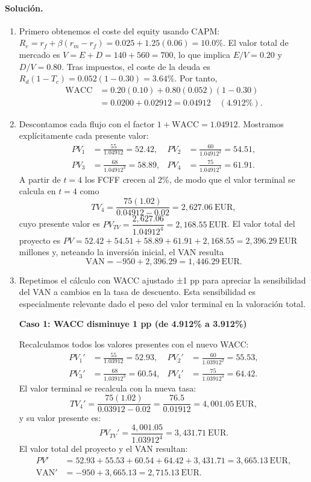 \documentclass[12pt,a4paper]{article}
\newcommand{\EUR}[1]{\ensuremath{#1~\text{EUR}}}
\newenvironment{solucion}{\paragraph{Solución.}}{}
\begin{document}
\begin{solucion}
\begin{enumerate}[label=\alph*)]
\item Primero obtenemos el coste del equity usando CAPM: $R_e = r_f + \beta(r_m - r_f) = 0.025 + 1.25(0.06) = 10.0\%$. El valor total de mercado es $V = E + D = 140 + 560 = 700$, lo que implica $E/V = 0.20$ y $D/V = 0.80$. Tras impuestos, el coste de la deuda es $R_d(1-T_c) = 0.052(1-0.30) = 3.64\%$. Por tanto,
\begin{align*}
\text{WACC} &= 0.20(0.10) + 0.80(0.052)(1-0.30) \\
            &= 0.0200 + 0.02912 = 0.04912 \quad (4.912\%).
\end{align*}
\item Descontamos cada flujo con el factor $1+\text{WACC} = 1.04912$. Mostramos explícitamente cada presente valor:
\begin{align*}
PV_{1} &= \frac{55}{1.04912} = 52.42, &
PV_{2} &= \frac{60}{1.04912^2} = 54.51,\\[-2pt]
PV_{3} &= \frac{68}{1.04912^3} = 58.89, &
PV_{4} &= \frac{75}{1.04912^4} = 61.91.
\end{align*}
A partir de $t=4$ los FCFF crecen al 2\%, de modo que el valor terminal se calcula en $t=4$ como
\[
TV_4 = \frac{75(1.02)}{0.04912-0.02} = \EUR{2{,}627.06},
\]
cuyo presente valor es $PV_{TV} = \dfrac{2{,}627.06}{1.04912^4} = \EUR{2{,}168.55}$. El valor total del proyecto es $PV = 52.42 + 54.51 + 58.89 + 61.91 + 2{,}168.55 = \EUR{2{,}396.29}$ millones y, neteando la inversión inicial, el VAN resulta
\[
\text{VAN} = -950 + 2{,}396.29 = \EUR{1{,}446.29}.
\]
\item Repetimos el cálculo con WACC ajustado ±1 pp para apreciar la sensibilidad del VAN a cambios en la tasa de descuento. Esta sensibilidad es especialmente relevante dado el peso del valor terminal en la valoración total.

\textbf{Caso 1: WACC disminuye 1 pp (de 4.912\% a 3.912\%)}

Recalculamos todos los valores presentes con el nuevo WACC:
\begin{align*}
PV_1' &= \frac{55}{1.03912} = 52.93, &
PV_2' &= \frac{60}{1.03912^2} = 55.53,\\[-2pt]
PV_3' &= \frac{68}{1.03912^3} = 60.54, &
PV_4' &= \frac{75}{1.03912^4} = 64.42.
\end{align*}
El valor terminal se recalcula con la nueva tasa:
\[
TV_4' = \frac{75(1.02)}{0.03912-0.02} = \frac{76.5}{0.01912} = \EUR{4{,}001.05},
\]
y su valor presente es:
\[
PV_{TV}' = \frac{4{,}001.05}{1.03912^4} = \EUR{3{,}431.71}.
\]
El valor total del proyecto y el VAN resultan:
\begin{align*}
PV' &= 52.93 + 55.53 + 60.54 + 64.42 + 3{,}431.71 = \EUR{3{,}665.13},\\
\text{VAN}' &= -950 + 3{,}665.13 = \EUR{2{,}715.13}.
\end{align*}


\end{enumerate}
\end{solucion}
\end{document}
